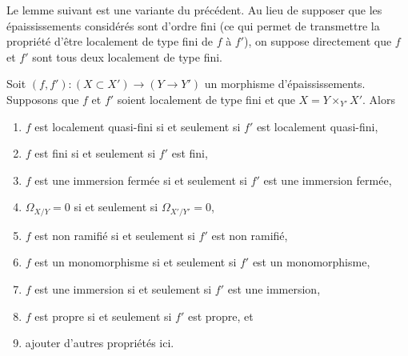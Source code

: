 \noindent
Le lemme suivant est une variante du précédent. Au lieu de supposer
que les épaississements considérés sont d'ordre fini (ce qui permet de transmettre
la propriété d'être localement de type fini de $f$ à $f'$),
on suppose directement que $f$ et $f'$ sont tous deux localement de
type fini.

\begin{lemma}
\label{lemma-properties-that-extend-over-thickenings}
Soit $(f, f') : (X \subset X') \to (Y \to Y')$ un morphisme
d'épaississements. Supposons que $f$ et $f'$ soient localement de type fini
et que $X = Y \times_{Y'} X'$. Alors
\begin{enumerate}
\item $f$ est localement quasi-fini si et seulement si $f'$ est localement quasi-fini,
\item $f$ est fini si et seulement si $f'$ est fini,
\item $f$ est une immersion fermée si et seulement si $f'$ est une immersion fermée,
\item $\Omega_{X/Y} = 0$ si et seulement si $\Omega_{X'/Y'} = 0$,
\item $f$ est non ramifié si et seulement si $f'$ est non ramifié,
\item $f$ est un monomorphisme si et seulement si $f'$ est un monomorphisme,
\item $f$ est une immersion si et seulement si $f'$ est une immersion,
\item $f$ est propre si et seulement si $f'$ est propre, et
\item ajouter d'autres propriétés ici.
\end{enumerate}
\end{lemma}

